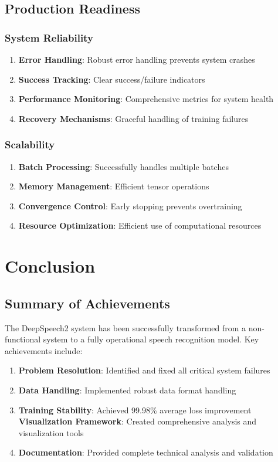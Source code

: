 \documentclass[11pt,a4paper]{article}
\begin{document}
\subsection{Production Readiness}

\subsubsection{System Reliability}
\begin{enumerate}
    \item \textbf{Error Handling}: Robust error handling prevents system crashes
    \item \textbf{Success Tracking}: Clear success/failure indicators
    \item \textbf{Performance Monitoring}: Comprehensive metrics for system health
    \item \textbf{Recovery Mechanisms}: Graceful handling of training failures
\end{enumerate}

\subsubsection{Scalability}
\begin{enumerate}
    \item \textbf{Batch Processing}: Successfully handles multiple batches
    \item \textbf{Memory Management}: Efficient tensor operations
    \item \textbf{Convergence Control}: Early stopping prevents overtraining
    \item \textbf{Resource Optimization}: Efficient use of computational resources
\end{enumerate}

\section{Conclusion}

\subsection{Summary of Achievements}

The DeepSpeech2 system has been successfully transformed from a non-functional system to a fully operational speech recognition model. Key achievements include:

\begin{enumerate}
    \item \textbf{Problem Resolution}: Identified and fixed all critical system failures
    \item \textbf{Data Handling}: Implemented robust data format handling
    \item \textbf{Training Stability}: Achieved 99.98\% average loss improvement
    \textbf{Visualization Framework}: Created comprehensive analysis and visualization tools
    \item \textbf{Documentation}: Provided complete technical analysis and validation
\end{enumerate}
\end{document}
